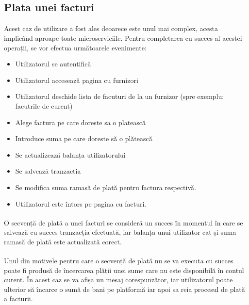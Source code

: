 \documentclass[12pt]{report}
\begin{document}
  	\subsection{Plata unei facturi}
  	\paragraph{}Acest caz de utilizare a fost ales deoarece este unul mai complex, acesta implicând aproape toate microserviciile. Pentru completarea cu succes al acestei operații, se vor efectua următoarele evenimente:
  	\begin{itemize}
  	\item Utilizatorul se autentifică
	\item Utilizatorul accesează pagina cu furnizori 	
  	\item Utilizatorul deschide lista de facuturi de la un furnizor (spre exemplu: facutrile de curent)
  	\item Alege factura pe care doreste sa o platească
  	\item Introduce suma pe care doreste să o plătească
  	\item Se actualizează balanța utilizatorului
  	\item Se salvează tranzactia
  	\item Se modifica suma ramasă de plată pentru factura respectivă.
  	\item Utilizatorul este întors pe pagina cu facturi.
  	\end{itemize}
  	\paragraph{}O secvență de plată a unei facturi se consideră un succes în momentul în care se salvează cu succes tranzacția efectuată, iar balanța unui utilizator cat și suma ramasă de plată este actualizată corect.
  	\paragraph{}Unul din motivele pentru care o secvență de plată nu se va executa cu succes poate fi produsă de încercarea plății unei sume care nu este disponibilă în contul curent. În acest caz se va afișa un mesaj corespunzător, iar utilizatorul poate ulterior să încarce o sumă de bani pe platformă iar apoi sa reia procesul de plată a facturii.
\end{document}
